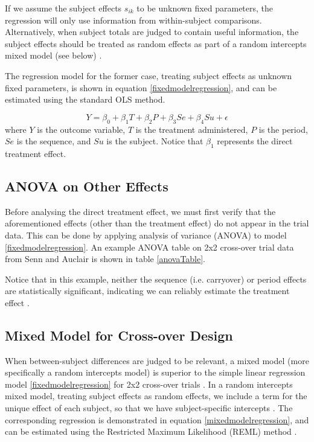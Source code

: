\documentclass[12pt, TexShade, letterpaper]{report}
\begin{document}
If we assume the subject effects $s_{ik}$ to be unknown fixed parameters, the regression will only use information from within-subject comparisons. Alternatively, when subject totals are judged to contain useful information, the subject effects should be treated as random effects as part of a random intercepts mixed model (see below) \cite{jones2003design}.

The regression model for the former case, treating subject effects as unknown fixed parameters, is shown in equation \ref{fixedmodelregression}, and can be estimated using the standard OLS method.

\begin{equation}
     Y = \beta_0 + \beta_1 T + \beta_2 P + \beta_3 Se + \beta_4 Su + \epsilon
     \label{fixedmodelregression}
\end{equation}
where $Y$ is the outcome variable, $T$ is the treatment administered, $P$ is the period, $Se$ is the sequence, and $Su$ is the subject. Notice that $\beta_1$ represents the direct treatment effect.

\subsection{ANOVA on Other Effects}
Before analysing the direct treatment effect, we must first verify that the aforementioned effects (other than the treatment effect) do not appear in the trial data. This can be done by applying analysis of variance (ANOVA) to model \ref{fixedmodelregression}. An example ANOVA table on 2x2 cross-over trial data from Senn and Auclair \cite{senn1990graphical} is shown in table \ref{anovaTable}.



Notice that in this example, neither the sequence (i.e. carryover) or period effects are statistically significant, indicating we can reliably estimate the treatment effect \cite{lim2021considerations}.

\subsection{Mixed Model for Cross-over Design}
When between-subject differences are judged to be relevant, a mixed model (more specifically a random intercepts model) is superior to the simple linear regression model \ref{fixedmodelregression} for 2x2 cross-over trials \cite{jones2003design}. In a random intercepts mixed model, treating subject effects as random effects, we include a term for the unique effect of each subject, so that we have subject-specific intercepts \cite{mixedmodelsR}. The corresponding regression is demonstrated in equation \ref{mixedmodelregression}, and can be estimated using the Restricted Maximum Likelihood (REML) method \cite{jones2003design}.
\end{document}
